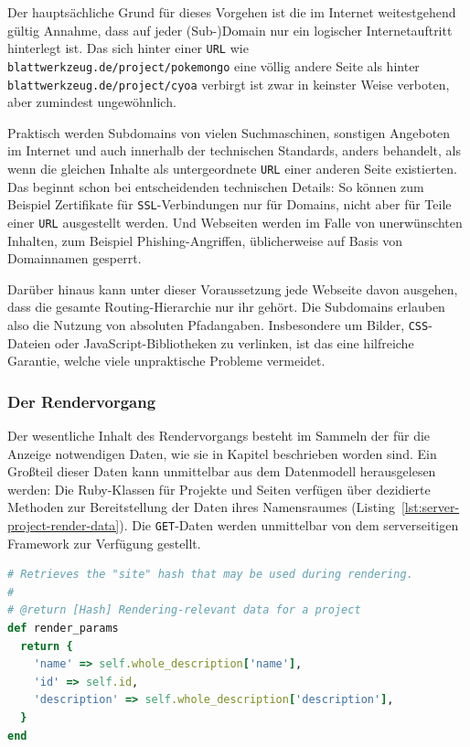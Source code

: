 Der hauptsächliche Grund für dieses Vorgehen ist die im Internet weitestgehend gültig Annahme, dass auf jeder (Sub-)Domain nur ein logischer Internetauftritt hinterlegt ist. Das sich hinter einer \texttt{URL} wie \texttt{blatt\-werk\-zeug.de\-/project\-/pokemongo} eine völlig andere Seite als hinter \texttt{blatt\-werk\-zeug.de\-/project\-/cyoa} verbirgt ist zwar in keinster Weise verboten, aber zumindest ungewöhnlich.

Praktisch werden Subdomains von vielen Suchmaschinen, sonstigen Angeboten im Internet und auch innerhalb der technischen Standards, anders behandelt, als wenn die gleichen Inhalte als untergeordnete \texttt{URL} einer anderen Seite existierten. Das beginnt schon bei entscheidenden technischen Details: So können zum Beispiel Zertifikate für \texttt{SSL}-Verbindungen nur für Domains, nicht aber für Teile einer \texttt{URL} ausgestellt werden. Und Webseiten werden im Falle von unerwünschten Inhalten, zum Beispiel Phishing-Angriffen, üblicherweise auf Basis von Domainnamen gesperrt.

Darüber hinaus kann unter dieser Voraussetzung jede Webseite davon ausgehen, dass die gesamte Routing-Hierarchie nur ihr gehört. Die Subdomains erlauben also die Nutzung von absoluten Pfadangaben. Insbesondere um Bilder, \texttt{CSS}-Dateien oder JavaScript-Bibliotheken zu verlinken, ist das eine hilfreiche Garantie, welche viele unpraktische Probleme vermeidet.

\subsubsection{Der Rendervorgang}

Der wesentliche Inhalt des Rendervorgangs besteht im Sammeln der für die Anzeige notwendigen Daten, wie sie in Kapitel  beschrieben worden sind. Ein Großteil dieser Daten kann unmittelbar aus dem Datenmodell herausgelesen werden: Die Ruby-Klassen für Projekte und Seiten verfügen über dezidierte Methoden zur Bereitstellung der Daten ihres Namensraumes (Listing~\ref{lst:server-project-render-data}). Die \texttt{GET}-Daten werden unmittelbar von dem serverseitigen Framework zur Verfügung gestellt.

\begin{lstlisting}[float=h, language=Ruby, caption={Bereitstellung der Renderdaten in der Projektklasse}, label={lst:server-project-render-data}]
# Retrieves the "site" hash that may be used during rendering.
#
# @return [Hash] Rendering-relevant data for a project
def render_params
  return {
    'name' => self.whole_description['name'],
    'id' => self.id,
    'description' => self.whole_description['description'],
  }
end
\end{lstlisting}

